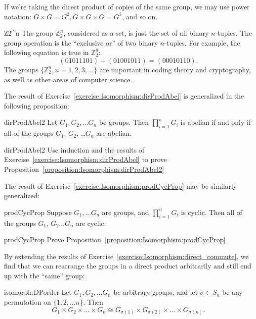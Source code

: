If  we're taking the direct product of copies of the same group, we may use power notation: $G \times G = G^2,  G \times G \times G = G^3$, and so on.
 
\begin{example}{Z2^n}
The group ${\mathbb Z}_2^n$, considered as a set, is just the set of all
binary $n$-tuples. The group operation is the ``exclusive or'' of two
binary $n$-tuples. For example, the following equation is true in ${\mathbb Z}_2^8$:
\[
(01011101) + (01001011) = (00010110).
\]
The groups $\{ {\mathbb Z}_2^n, n=1,2,3,\ldots\}$  are important in coding theory and cryptography, as well as other 
areas of computer science.  
\end{example}

The result of Exercise~\ref{exercise:Isomorphism:dirProdAbel} is generalized in the following proposition:

\begin{prop}{dirProdAbel2}
Let $G_1, G_2, \ldots G_n$ be groups.  Then $\prod_{i = 1}^n G_i$ is abelian if and only if all of the groups $G_1$, $G_2$, \ldots $G_n$ are abelian.  
\end{prop}
 
\begin{exercise}{dirProdAbel2}
Use induction and the results of Exercise~\ref{exercise:Isomorphism:dirProdAbel} to prove Proposition~\ref{proposition:Isomorphism:dirProdAbel2}
\end{exercise}


The result of Exercise~\ref{exercise:Isomorphism:prodCycProp} may be similarly generalized:

\begin{prop}{prodCycProp}
Suppose $G_1, \ldots G_n$ are groups, and $\prod_{i = 1}^n G_i$ is cyclic. Then all of the groups $G_1$, $G_2 \ldots G_n$ are cyclic. 
\end{prop}	
 
\begin{exercise}{prodCycProp}
Prove Proposition~\ref{proposition:Isomorphism:prodCycProp}
\end{exercise}


By extending the results of Exercise~\ref{exercise:Isomorphism:direct_commute}, we find that we can rearrange the groups in a direct product arbitrarily and still end up with the ``same'' group:

\begin{prop}{isomorph:DPorder}
Let $G_1,G_2, \ldots G_n$ be arbitrary groups, and let  $\sigma \in S_n$ be any permutation on $\{1,2,\ldots n\}$. Then
\[ G_1 \times G_2 \times \ldots \times G_n \cong G_{\sigma(1)} \times G_{\sigma(2)} \times \ldots \times G_{\sigma(n)}.\]
\end{prop}

